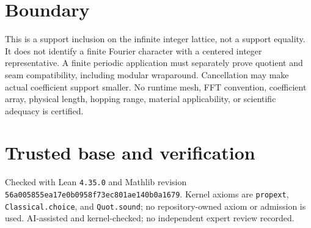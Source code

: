 \documentclass[11pt]{article}
\begin{document}
\section{Boundary}
This is a support inclusion on the infinite integer lattice, not a support equality. It does not identify a
finite Fourier character with a centered integer representative. A finite periodic application must
separately prove quotient and seam compatibility, including modular wraparound. Cancellation may
make actual coefficient support smaller. No runtime mesh, FFT convention, coefficient array,
physical length, hopping range, material applicability, or scientific adequacy is certified.

\section{Trusted base and verification}
Checked with Lean \texttt{4.35.0} and Mathlib revision
\texttt{56a005855ea17e0b0958f73ec801ae140b0a1679}. Kernel axioms are
\texttt{propext}, \texttt{Classical.choice}, and \texttt{Quot.sound}; no repository-owned axiom or
admission is used. AI-assisted and kernel-checked; no independent expert review recorded.
\end{document}
